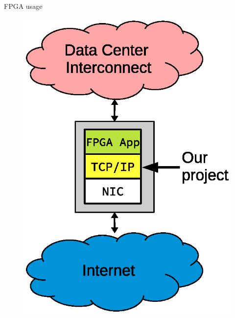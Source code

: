 \begin{frame}
FPGA usage
\begin{figure}
	\centering
\includegraphics[scale=0.5]{./background/fpga_usage.eps}
\end{figure}

\end{frame}

